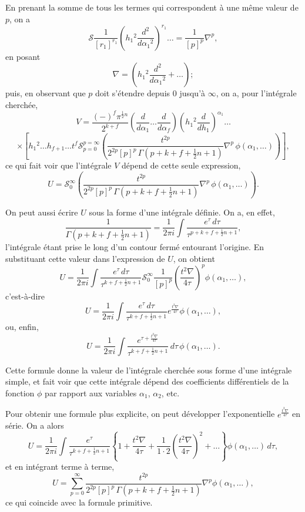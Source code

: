 \documentclass[11pt,a4paper]{article}
\begin{document}
\newpage
\setcounter{page}{199}

En prenant la somme de tous les termes qui correspondent \`{a} une m\^{e}me valeur
de $p$, on a
\[
\mathcal{S} \frac{1}{[r_1]^{r_1}} \left(h_1{}^{2} \frac{d^{2}}{d\alpha_1{}^{2}}\right)^{r_1} \ldots = \frac{1}{[p]^{p}} \nabla^{p},
\]
en posant
\[
\nabla = \left(h_1{}^{2} \frac{d^{2}}{d\alpha_1{}^{2}} + \ldots\right);
\]
puis, en observant que $p$ doit s'\'{e}tendre depuis $0$ jusqu'\`{a} $\infty$, on a, pour l'int\'{e}grale
cherch\'{e}e,
\[
V = \frac{(-)^f \pi^{\frac{1}{2}n}}{2^{k+f}} \left(\frac{d}{d\alpha_1} \ldots \frac{d}{d\alpha_f}\right) \left(h_1{}^{2} \frac{d}{dh_1}\right)^{\alpha_1} \ldots
\]
\[
\times \left[ h_1{}^{2} \ldots h_{f+1} \ldots t^{f} \mathcal{S}_{p=0}^{p=\infty} \left(\frac{t^{2p}}{2^{2p} [p]^{p} \, \Gamma\left(p + k + f + \tfrac{1}{2}n + 1\right)} \nabla^{p} \, \phi(\alpha_1, \ldots)\right)\right],
\]
ce qui fait voir que l'int\'{e}grale $V$ d\'{e}pend de cette seule expression,
\[
U = \mathcal{S}_{0}^{\infty} \left(\frac{t^{2p}}{2^{2p} [p]^{p} \, \Gamma\left(p + k + f + \tfrac{1}{2}n + 1\right)} \nabla^{p} \, \phi(\alpha_1, \ldots)\right).
\]

\newpage
\setcounter{page}{200}

On peut aussi \'{e}crire $U$ sous la forme d'une int\'{e}grale d\'{e}finie. On a, en effet,
\[
\frac{1}{\Gamma\left(p + k + f + \tfrac{1}{2}n + 1\right)} = \frac{1}{2\pi i} \int \frac{e^{\tau} \, d\tau}{\tau^{p+k+f+\frac{1}{2}n+1}},
\]
l'int\'{e}grale \'{e}tant prise le long d'un contour ferm\'{e} entourant l'origine. En substituant
cette valeur dans l'expression de $U$, on obtient
\[
U = \frac{1}{2\pi i} \int \frac{e^{\tau} \, d\tau}{\tau^{k+f+\frac{1}{2}n+1}} \mathcal{S}_{0}^{\infty} \frac{1}{[p]^{p}} \left(\frac{t^{2}\nabla}{4\tau}\right)^{p} \phi(\alpha_1, \ldots),
\]
c'est-\`{a}-dire
\[
U = \frac{1}{2\pi i} \int \frac{e^{\tau} \, d\tau}{\tau^{k+f+\frac{1}{2}n+1}} e^{\frac{t^{2}\nabla}{4\tau}} \phi(\alpha_1, \ldots),
\]
ou, enfin,
\[
U = \frac{1}{2\pi i} \int \frac{e^{\tau + \frac{t^{2}\nabla}{4\tau}}}{\tau^{k+f+\frac{1}{2}n+1}} \, d\tau \, \phi(\alpha_1, \ldots).
\]

\newpage
\setcounter{page}{201}

Cette formule donne la valeur de l'int\'{e}grale cherch\'{e}e sous forme d'une int\'{e}grale
simple, et fait voir que cette int\'{e}grale d\'{e}pend des coefficients diff\'{e}rentiels de la fonction
$\phi$ par rapport aux variables $\alpha_1$, $\alpha_2$, etc.

Pour obtenir une formule plus explicite, on peut d\'{e}velopper l'exponentielle
$e^{\frac{t^{2}\nabla}{4\tau}}$ en s\'{e}rie. On a alors
\[
U = \frac{1}{2\pi i} \int \frac{e^{\tau}}{\tau^{k+f+\frac{1}{2}n+1}} \left\{1 + \frac{t^{2}\nabla}{4\tau} + \frac{1}{1 \cdot 2} \left(\frac{t^{2}\nabla}{4\tau}\right)^{2} + \ldots\right\} \phi(\alpha_1, \ldots) \, d\tau,
\]
et en int\'{e}grant terme \`{a} terme,
\[
U = \sum_{p=0}^{\infty} \frac{t^{2p}}{2^{2p} [p]^{p} \, \Gamma\left(p + k + f + \tfrac{1}{2}n + 1\right)} \nabla^{p} \phi(\alpha_1, \ldots),
\]
ce qui coincide avec la formule primitive.
\end{document}
